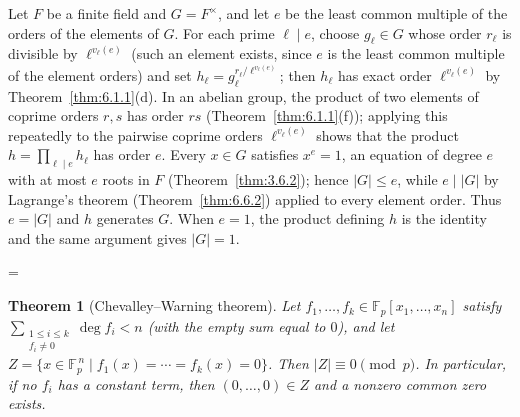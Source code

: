 \documentclass[11pt]{article}
\makeatletter
\theoremstyle{ntstyle}
\newtheorem{theorem}{Theorem}[subsection]
\let\nt@closedisplay\]
\def\nt@guardedclose{\@ifnextchar\par{\nt@closeafterpar}{\@ifnextchar\end{\postdisplaypenalty\@M\nt@closedisplay}{\nt@closedisplay}}}
\def\nt@closeafterpar\par{\@ifnextchar\par{\nt@closeafterpar}{\@ifnextchar\end{\postdisplaypenalty\@M\nt@closedisplay\par}{\nt@closedisplay\par}}}
\renewenvironment{proof}[1][\proofname]{\par
  \pushQED{\qed}\normalfont\topsep\medskipamount\edef\nt@afterproof{\@endparpenalty=\the\@endparpenalty\relax}\@beginparpenalty\@M\@endparpenalty\@M\let\]\nt@guardedclose\trivlist\item[]\textit{#1\@addpunct{.}} \ignorespaces}{\ifvmode\addpenalty\@M\fi\popQED\nt@afterproof\endtrivlist\@endpefalse}
\makeatother
\begin{document}
\begin{proof} Let $F$ be a finite field and $G=F^{\times}$, and let
	$e$ be the least common multiple of the orders of the elements of $G$. For
	each prime $\ell\mid e$, choose $g_\ell\in G$ whose order $r_\ell$ is
	divisible by $\ell^{v_\ell(e)}$ (such an element exists, since $e$ is the least
	common multiple of the element orders) and set
	$h_\ell=g_\ell^{r_\ell/\ell^{v_\ell(e)}}$; then $h_\ell$ has exact order
	$\ell^{v_\ell(e)}$ by Theorem~\ref{thm:6.1.1}(d). In an abelian group, the
	product of two elements of coprime orders $r,s$ has order $rs$
	(Theorem~\ref{thm:6.1.1}(f)); applying this repeatedly to the pairwise coprime orders
	$\ell^{v_\ell(e)}$ shows that the product $h=\prod_{\ell\mid e}h_\ell$ has order $e$.
	Every $x\in G$ satisfies $x^{e}=1$, an equation of degree $e$ with at most
	$e$ roots in $F$ (Theorem~\ref{thm:3.6.2}); hence $|G|\le e$, while
	$e\mid|G|$ by Lagrange's theorem (Theorem~\ref{thm:6.6.2}) applied to every element order. Thus $e=|G|$ and $h$ generates $G$. When $e=1$, the product defining $h$ is the identity and the same argument gives $|G|=1$.

\end{proof}
\begin{theorem}[Chevalley--Warning theorem]\label{thm:6.10.2} Let $f_1,
		\ldots, f_k \in \mathbb{F}_p[x_1, \ldots, x_n]$ satisfy
	$\sum_{\substack{1\le i\le k\\ f_i\neq0}} \deg f_i < n$ (with the
	empty sum equal to $0$), and let $Z = \{x \in
		\mathbb{F}_p^{\,n} \mid f_1(x) = \cdots = f_k(x) = 0\}$. Then $|Z|
		\equiv 0 \pmod{p}$. In particular, if no $f_i$ has a constant term, then $(0,\ldots,0)\in Z$ and a nonzero common zero exists.

\end{theorem}
\end{document}
